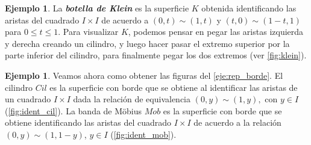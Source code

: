 \documentclass[10pt]{report}
\newcommand{\enfatiza}[1]{\textbf{\textit{#1}}}
\theoremstyle{definition}
\newtheorem{eje}[defin]{Ejemplo}
\begin{document}
\begin{eje}\label{eje:klein}%
La \enfatiza{botella de Klein} es la superficie $K$ obtenida identificando las aristas del cuadrado $I\times I$ de acuerdo a $(0,t)\sim (1,t)$ y $(t,0)\sim (1-t,1)$ para $0\leq t\leq 1$.  Para visualizar $K$, podemos pensar en pegar las aristas izquierda y derecha creando un cilindro, y luego hacer pasar el extremo superior por la parte inferior del cilindro, para finalmente pegar los dos extremos (ver \autoref{fig:klein}).
\end{eje}

\begin{eje}\label{eje:rep_mobius}
Veamos ahora como obtener las figuras del \autoref{eje:rep_borde}. El cilindro $Cil$ es la superficie con borde que se obtiene al identificar las aristas de un cuadrado $I\times I$ dada la relación de equivalencia $(0,y)\sim (1,y),$ con $y\in I$ (\autoref{fig:ident_cil}). La banda de Möbius $Mob$ es la superficie con borde que se obtiene identificando las aristas del cuadrado $I\times I$ de acuerdo a la relación $(0,y)\sim (1,1-y)$, $y\in I$ (\autoref{fig:ident_mob}).
\end{eje}
\end{document}
